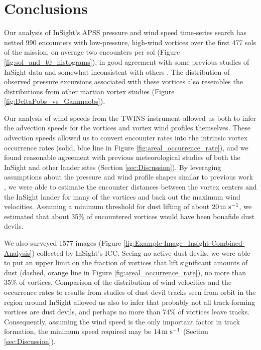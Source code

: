 \documentclass[linenumbers,trackchanges]{aastex63}
\begin{document}
\section{Conclusions}
\label{sec:Conclusions}

Our analysis of InSight's APSS pressure and wind speed time-series search has netted 990 encounters with low-pressure, high-wind vortices over the first 477 sols of the mission, on average two encounters per sol (Figure \ref{fig:sol_and_t0_histograms}), in good agreement with some previous studies of InSight data \citep{2021Icar..35514119L} and somewhat inconsistent with others \citep{2021JGRE..12606511S}. The distribution of observed pressure excursions associated with these vortices also resembles the distributions from other martian vortex studies (Figure \ref{fig:DeltaPobs_vs_Gammaobs}). 

Our analysis of wind speeds from the TWINS instrument allowed us both to infer the advection speeds for the vortices and vortex wind profiles themselves. These advection speeds allowed us to convert encounter rates into the intrinsic vortex occurrence rates (solid, blue line in Figure \ref{fig:areal_occurrence_rate}), and we found reasonable agreement with previous meteorological studies of both the InSight and other lander sites (Section \ref{sec:Discussion}). By leveraging assumptions about the pressure and wind profile shapes similar to previous work \citep{2016Icar..271..326L}, we were able to estimate the encounter distances between the vortex centers and the InSight lander for many of the vortices and back out the maximum wind velocities. Assuming a minimum threshold for dust lifting of about $20\,{\rm m\ s^{-1}}$, we estimated that about 35\% of encountered vortices would have been bonafide dust devils. 

We also surveyed 1577 images (Figure \ref{fig:Example-Image_Insight-Combined-Analysis}) collected by InSight's ICC. Seeing no active dust devils, we were able to put an upper limit on the fraction of vortices that lift significant amounts of dust (dashed, orange line in Figure \ref{fig:areal_occurrence_rate}), no more than 35\% of vortices. Comparison of the distribution of wind velocities and the occurrence rates to results from studies of dust devil tracks seen from orbit in the region around InSight \citep{2020GeoRL..4787234P} allowed us also to infer that probably not all track-forming vortices are dust devils, and perhaps no more than 74\% of vortices leave tracks. Consequently, assuming the wind speed is the only important factor in track formation, the minimum speed required may be $14\,{\rm m\ s^{-1}}$ (Section \ref{sec:Discussion}). 
\end{document}
